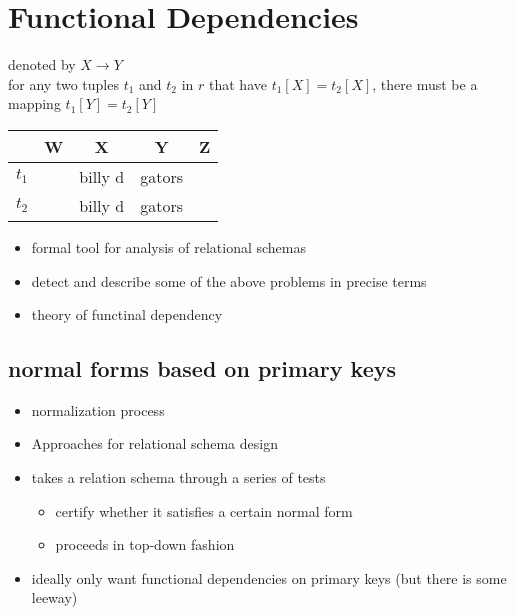 \documentclass[12pt]{article}
\begin{document}
\section{Functional Dependencies}
denoted by $X \rightarrow Y$\\
for any two tuples $t_1$ and $t_2$ in $r$ that have $t_1[X] = t_2[X]$, there
must be a mapping $t_1[Y] = t_2[Y]$\\

\begin{tabular}{c|c|c|c|c}
  & W & X & Y & Z\\
  \hline
  $t_1$ &  & billy d & gators & \\
  \hline
  $t_2$ & & billy d & gators & \\
  \hline
\end{tabular}

\begin{itemize}
  \item {formal tool for analysis of relational schemas}
  \item {detect and describe some of the above problems in precise terms}
  \item {theory of functinal dependency}
\end{itemize}

\subsection{normal forms based on primary keys}
\begin{itemize}
  \item {normalization process}
  \item {Approaches for relational schema design}
\end{itemize}
\begin{itemize}
  \item {
      takes a relation schema through a series of tests
      \begin{itemize}
        \item {certify whether it satisfies a certain normal form}
        \item {proceeds in top-down fashion}
      \end{itemize}
    }
  \item {ideally only want functional dependencies on primary keys (but there
      is some leeway)}
\end{itemize}
\end{document}
